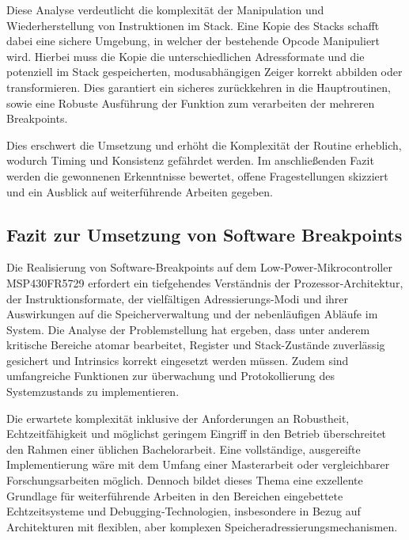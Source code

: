 Diese Analyse verdeutlicht die komplexit\"at der Manipulation und Wiederherstellung von Instruktionen im Stack. Eine Kopie des Stacks schafft dabei eine sichere Umgebung, in welcher der bestehende Opcode Manipuliert wird. Hierbei muss die Kopie die unterschiedlichen Adressformate und die potenziell im Stack gespeicherten, modusabh\"angigen Zeiger korrekt abbilden oder transformieren. Dies garantiert ein sicheres zur\"uckkehren in die Hauptroutinen, sowie eine Robuste Ausf\"uhrung der Funktion zum verarbeiten der \ggf mehreren Breakpoints.

Dies erschwert die Umsetzung und erh\"oht die Komplexit\"at der Routine erheblich, wodurch Timing und Konsistenz gef\"ahrdet werden. Im anschlie{\ss}enden Fazit werden die gewonnenen Erkenntnisse bewertet, offene Fragestellungen skizziert und ein Ausblick auf weiterf\"uhrende Arbeiten gegeben.

\subsection{Fazit zur Umsetzung von Software Breakpoints}
\label{sec:FazitSoftwareBreakpoints}

Die Realisierung von Software-Breakpoints auf dem Low‑Power‑Mikrocontroller MSP430FR5729 erfordert ein tiefgehendes Verst\"andnis der Prozessor‑Architektur, der Instruktionsformate, der vielf\"altigen Adressierungs-Modi und ihrer Auswirkungen auf die Speicherverwaltung und der nebenl\"aufigen Abl\"aufe im System. Die Analyse der Problemstellung hat ergeben, dass unter anderem kritische Bereiche atomar bearbeitet, Register und Stack-Zust\"ande zuverl\"assig gesichert und Intrinsics korrekt eingesetzt werden m\"ussen. Zudem sind umfangreiche Funktionen zur \"uberwachung und Protokollierung des Systemzustands zu implementieren.

Die erwartete komplexit\"at inklusive der Anforderungen an Robustheit, Echtzeitf\"ahigkeit und m\"oglichst geringem Eingriff in den Betrieb \"uberschreitet den Rahmen einer \"ublichen Bachelorarbeit. Eine vollst\"andige, ausgereifte Implementierung w\"are mit dem Umfang einer Masterarbeit oder vergleichbarer Forschungsarbeiten m\"oglich. Dennoch bildet dieses Thema eine exzellente Grundlage f\"ur weiterf\"uhrende Arbeiten in den Bereichen eingebettete Echtzeitsysteme und Debugging‑Technologien, insbesondere in Bezug auf Architekturen mit flexiblen, aber komplexen Speicheradressierungsmechanismen.

